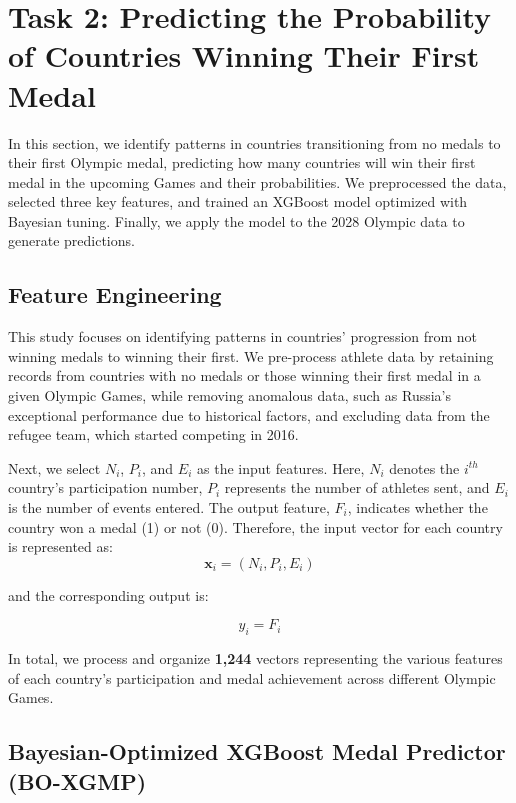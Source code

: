\documentclass[12pt]{article}  %
\begin{document}
\section{Task 2: Predicting the Probability of Countries Winning Their First Medal}


In this section, we identify patterns in countries transitioning from no medals to their first Olympic medal, predicting how many countries will win their first medal in the upcoming Games and their probabilities. We preprocessed the data, selected three key features, and trained an XGBoost model optimized with Bayesian tuning. Finally, we apply the model to the 2028 Olympic data to generate predictions.

\subsection{Feature Engineering}

This study focuses on identifying patterns in countries’ progression from not winning medals to winning their first. We pre-process athlete data by retaining records from countries with no medals or those winning their first medal in a given Olympic Games, while removing anomalous data, such as Russia’s exceptional performance due to historical factors, and excluding data from the refugee team, which started competing in 2016.

Next, we select $N_i$, $P_i$, and $E_i$ as the input features. Here, $N_i$ denotes the $i^{th}$ country's participation number, $P_i$ represents the number of athletes sent, and $E_i$ is the number of events entered. The output feature, $F_i$, indicates whether the country won a medal (1) or not (0). Therefore, the input vector for each country is represented as:
\begin{equation}
    \mathbf{x}_i = (N_i, P_i, E_i) \tag{6}
\end{equation}

and the corresponding output is:

\begin{equation}
    y_i = F_i \tag{7}
\end{equation}


In total, we process and organize \textbf{1,244} vectors representing the various features of each country's participation and medal achievement across different Olympic Games.

\subsection{Bayesian-Optimized XGBoost Medal Predictor (BO-XGMP)}
\end{document}
